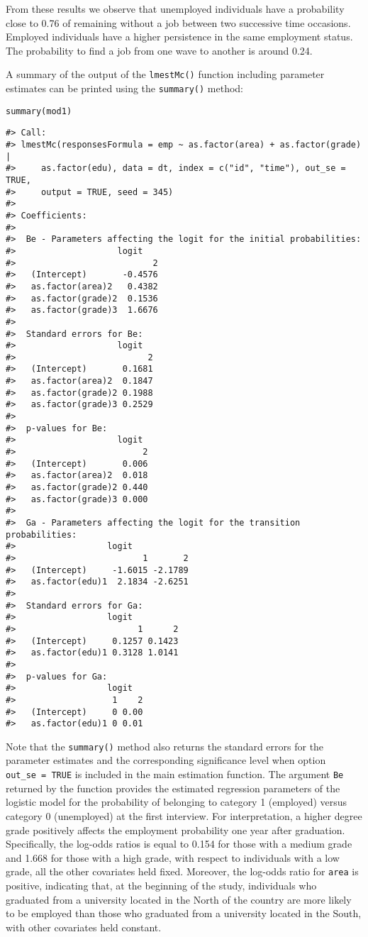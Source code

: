 \noindent From these results we observe that unemployed individuals have
a probability close to 0.76 of remaining without a job between two
successive time occasions. Employed individuals have a higher
persistence in the same employment status. The probability to find a job
from one wave to another is around 0.24.

A summary of the output of the \texttt{lmestMc()} function including parameter
estimates can be printed using the \texttt{summary()} method:

\begin{verbatim}
summary(mod1)
\end{verbatim}

\begin{verbatim}
#> Call:
#> lmestMc(responsesFormula = emp ~ as.factor(area) + as.factor(grade) | 
#>     as.factor(edu), data = dt, index = c("id", "time"), out_se = TRUE, 
#>     output = TRUE, seed = 345)
#> 
#> Coefficients:
#> 
#>  Be - Parameters affecting the logit for the initial probabilities:
#>                    logit
#>                           2
#>   (Intercept)       -0.4576
#>   as.factor(area)2   0.4382
#>   as.factor(grade)2  0.1536
#>   as.factor(grade)3  1.6676
#> 
#>  Standard errors for Be:
#>                    logit
#>                          2
#>   (Intercept)       0.1681
#>   as.factor(area)2  0.1847
#>   as.factor(grade)2 0.1988
#>   as.factor(grade)3 0.2529
#> 
#>  p-values for Be:
#>                    logit
#>                         2
#>   (Intercept)       0.006
#>   as.factor(area)2  0.018
#>   as.factor(grade)2 0.440
#>   as.factor(grade)3 0.000
#> 
#>  Ga - Parameters affecting the logit for the transition probabilities:
#>                  logit
#>                         1       2
#>   (Intercept)     -1.6015 -2.1789
#>   as.factor(edu)1  2.1834 -2.6251
#> 
#>  Standard errors for Ga:
#>                  logit
#>                        1      2
#>   (Intercept)     0.1257 0.1423
#>   as.factor(edu)1 0.3128 1.0141
#> 
#>  p-values for Ga:
#>                  logit
#>                   1    2
#>   (Intercept)     0 0.00
#>   as.factor(edu)1 0 0.01
\end{verbatim}

Note that the \texttt{summary()} method also returns the standard errors for
the parameter estimates and the corresponding significance level when
option \texttt{out\_se\ =\ TRUE} is included in the main estimation function. The
argument \texttt{Be} returned by the function provides the estimated regression
parameters of the logistic model for the probability of belonging to
category 1 (employed) versus category 0 (unemployed) at the first
interview. For interpretation, a higher degree grade positively affects
the employment probability one year after graduation. Specifically, the
log-odds ratios is equal to 0.154 for those with a medium grade and
1.668 for those with a high grade, with respect to individuals with a
low grade, all the other covariates held fixed.
Moreover,
the log-odds ratio for \texttt{area} is positive, indicating that, at the
beginning of the study, individuals who graduated from a university
located in the North of the country are more likely to be employed than
those who graduated from a university located in the South, with other
covariates held constant.

